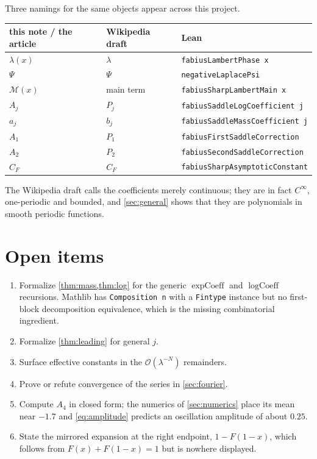\documentclass[11pt,oneside]{article}
\theoremstyle{definition}
\theoremstyle{remark}
\newcommand{\bigO}{\mathcal O}
\begin{document}
Three namings for the same objects appear across this project.

\begin{center}
\begin{tabular}{@{}lll@{}}
\toprule
this note / the article & Wikipedia draft & Lean\\
\midrule
$\lambda(x)$ & $\lambda$ & \texttt{fabiusLambertPhase x}\\
$\Psi$ & $\Psi$ & \texttt{negativeLaplacePsi}\\
$\mathcal M(x)$ & main term & \texttt{fabiusSharpLambertMain x}\\
$A_j$ & $P_j$ & \texttt{fabiusSaddleLogCoefficient j}\\
$a_j$ & $b_j$ & \texttt{fabiusSaddleMassCoefficient j}\\
$A_1$ & $P_1$ & \texttt{fabiusFirstSaddleCorrection}\\
$A_2$ & $P_2$ & \texttt{fabiusSecondSaddleCorrection}\\
$C_F$ & $C_F$ & \texttt{fabiusSharpAsymptoticConstant}\\
\bottomrule
\end{tabular}
\end{center}

The Wikipedia draft calls the coefficients merely continuous; they are in fact
$C^\infty$, one-periodic and bounded, and \cref{sec:general} shows that they are
polynomials in smooth periodic functions.

\section{Open items}\label{sec:open}

\begin{enumerate}
\item Formalize \cref{thm:mass,thm:log} for the generic
  $\operatorname{expCoeff}$ and $\operatorname{logCoeff}$ recursions.  Mathlib
  has \texttt{Composition n} with a \texttt{Fintype} instance but no
  first-block decomposition equivalence, which is the missing combinatorial
  ingredient.
\item Formalize \cref{thm:leading} for general $j$.
\item Surface effective constants in the $\bigO(\lambda^{-N})$ remainders.
\item Prove or refute convergence of the series in \cref{sec:fourier}.
\item Compute $A_4$ in closed form; the numerics of \cref{sec:numerics} place
  its mean near $-1.7$ and \cref{eq:amplitude} predicts an oscillation
  amplitude of about $0.25$.
\item State the mirrored expansion at the right endpoint, $1-F(1-x)$, which
  follows from $F(x)+F(1-x)=1$ but is nowhere displayed.
\end{enumerate}
\end{document}
